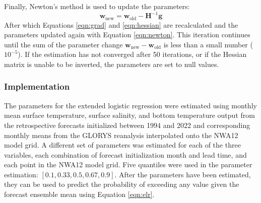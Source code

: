 \documentclass[12pt]{article}
\begin{document}
Finally, Newton's method is used to update the parameters:
\begin{equation}
    \mathbf{w}_{\textrm{new}} = \mathbf{w}_{\textrm{old}} - \mathbf{H}^{-1} \mathbf{g}
    \label{eqn:newton}
\end{equation}
After which Equations \ref{eqn:grad} and \ref{eqn:hessian} are recalculated and the parameters
updated again with Equation \ref{eqn:newton}.
This iteration continues until the sum of the parameter change
$\mathbf{w}_{\textrm{new}} - \mathbf{w}_{\textrm{old}}$ is less than a small number ($10^{-5}$).
If the estimation has not converged after 50 iterations, or if the Hessian matrix
is unable to be inverted, the parameters are set to null values.

\subsubsection{Implementation}

The parameters for the extended logistic regression were
estimated using monthly mean surface temperature, surface salinity, and bottom temperature output
from the retrospective forecasts initialized between 1994 and 2022
and corresponding monthly means from the GLORYS reanalysis \citep{Jean-Michel2021} interpolated
onto the NWA12 model grid.
A different set of parameters was estimated for each of the three variables,
each combination of forecast initialization month and lead time, and each
point in the NWA12 model grid.
Five quantiles were used in the parameter estimation: $ [0.1, 0.33, 0.5, 0.67, 0.9]$.
After the parameters have been estimated,
they can be used to predict the probability of exceeding any value given the forecast ensemble mean
using Equation \ref{eqn:elr}.



\end{document}
